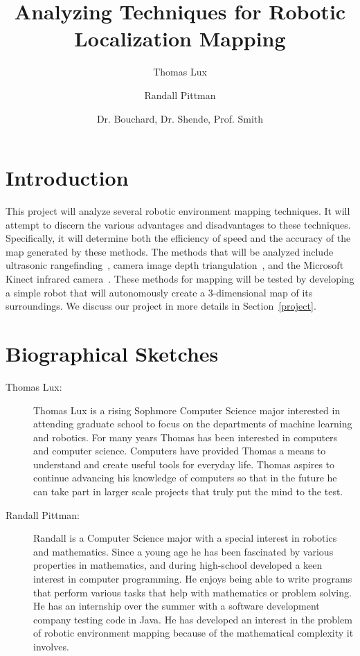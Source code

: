 \documentclass{article}
\title{Analyzing Techniques for Robotic Localization Mapping}
\author{Thomas Lux \and Randall Pittman}
\date{Dr. Bouchard, Dr. Shende, Prof. Smith}
\begin{document}
\maketitle

\section{Introduction}

This project will analyze several robotic environment mapping
techniques.  It will attempt to discern the various advantages and
disadvantages to these techniques.  Specifically, it will determine
both the efficiency of speed and the accuracy of the map generated by
these methods.  The methods that will be analyzed include ultrasonic
rangefinding~\cite{montemerlo}, camera image depth triangulation~\cite{thrun}, and the Microsoft
Kinect infrared camera~\cite{gil}.  These methods for mapping will be tested by
developing a simple robot that will autonomously create a
3-dimensional map of its surroundings. We discuss our project in more
details in Section~\ref{project}.



\section{Biographical Sketches}

\begin{description}

\item [Thomas Lux:] Thomas Lux is a rising Sophmore Computer Science
  major interested in attending graduate school to focus on the
  departments of machine learning and robotics.  For many years Thomas
  has been interested in computers and computer science.  Computers
  have provided Thomas a means to understand and create useful tools
  for everyday life.  Thomas aspires to continue advancing his
  knowledge of computers so that in the future he can take part in
  larger scale projects that truly put the mind to the test.

\item [Randall Pittman:] Randall is a Computer Science major with a special interest in
        robotics and mathematics.  Since a young age he has been
        fascinated by various properties in mathematics, and during
        high-school developed a keen interest in computer programming.
        He enjoys being able to write programs that perform various
        tasks that help with mathematics or problem solving.  He has
        an internship over the summer with a software development
        company testing code in Java.  He has developed an interest in
        the problem of robotic environment mapping because of the
        mathematical complexity it involves.   
\end{description}
\end{document}
